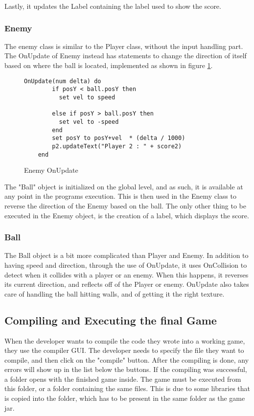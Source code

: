 Lastly, it updates the Label containing the label used to show the score. 

\subsubsection{Enemy}
The enemy class is similar to the Player class, without the input handling part. The OnUpdate of Enemy instead has statements to change the direction of itself based on where the ball is located, implemented as shown in figure \ref{fig:enemyupdate}.

\begin{figure}[H]
    \centering
    \begin{lstlisting}[style=gglang]
    OnUpdate(num delta) do                           
        if posY < ball.posY then            
          set vel to speed
    
        else if posY > ball.posY then
          set vel to -speed
        end
        set posY to posY+vel  * (delta / 1000)
        p2.updateText("Player 2 : " + score2)
    end
    \end{lstlisting}
    \caption{Enemy OnUpdate}\label{fig:enemyupdate}
\end{figure}

The "Ball" object is initialized on the global level, and as such, it is available at any point in the programs execution. This is then used in the Enemy class to reverse the direction of the Enemy based on the ball. 
The only other thing to be executed in the Enemy object, is the creation of a label, which displays the score. 


\subsubsection{Ball}
The Ball object is a bit more complicated than Player and Enemy. In addition to having speed and direction, through the use of OnUpdate, it uses OnCollision to detect when it collides with a player or an enemy. When this happens, it reverses its current direction, and reflects off of the Player or enemy. OnUpdate also takes care of handling the ball hitting walls, and of getting it the right texture. 

\subsection{Compiling and Executing the final Game}
When the developer wants to compile the \lang{} code they wrote into a working game, they use the \lang{} compiler GUI. The developer needs to specify the file they want to compile, and then click on the "compile" button. After the compiling is done, any errors will show up in the list below the buttons. If the compiling was successful, a folder opens with the finished game inside. The game must be executed from this folder, or a folder containing the same files. This is due to some libraries that is copied into the folder, which has to be present in the same folder as the game jar. 

